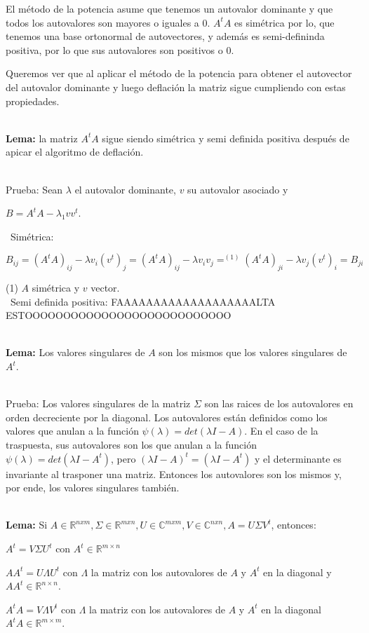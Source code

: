 El método de la potencia asume que tenemos un autovalor dominante y que todos los autovalores son
mayores o iguales a 0. $A^t A$ es simétrica por lo, que tenemos una base ortonormal de autovectores,
y además es semi-defininda positiva, por lo que sus autovalores son positivos o 0.

Queremos ver que al aplicar el método de la potencia para obtener el autovector del autovalor
dominante y luego deflación la matriz sigue cumpliendo con estas propiedades.

\ \\
\textbf{Lema:} la matriz $A^t A$ sigue siendo simétrica y semi definida positiva después de apicar el
algoritmo de deflación.

\ \\
Prueba: Sean $\lambda$ el autovalor dominante, $v$ su autovalor asociado y

$B = A^t A - \lambda_{1} v v^t$.

\ Simétrica:


\begin{center}
  $B_{ij} = (A^t A)_{ij} - \lambda v_i (v^t)_j = (A^t A)_{ij} - \lambda v_i v_j =^{(1)} (A^t A)_{ji}
  - \lambda v_j (v^t)_i = B_{ji}$
\end{center}

(1) $A$ simétrica y $v$ vector.
\ \\

\ Semi definida positiva: FAAAAAAAAAAAAAAAAAAALTA ESTOOOOOOOOOOOOOOOOOOOOOOOOOOO

\ \\
\textbf{Lema:} Los valores singulares de $A$ son los mismos que los valores singulares de $A^t$.

\ \\
Prueba: Los valores singulares de la matriz $\Sigma$ son las raices de los autovalores en orden
decreciente por la diagonal. Los autovalores están definidos como los valores que anulan a la
función
$\psi(\lambda) = det(\lambda I - A)$. En el caso de la traspuesta, sus autovalores son los que
anulan a la función $\psi(\lambda) = det(\lambda I - A^t)$, pero $(\lambda I - A)^t = (\lambda I -
A^t)$ y el determinante es invariante al trasponer una matriz. Entonces los autovalores son los
mismos y, por ende, los valores singulares también.


\ \\
\textbf{Lema:} Si $A \in \mathbb{R}^{nxm},\Sigma \in \mathbb{R}^{mxn}, U \in \mathbb{C}^{mxm}, V \in
\mathbb{C}^{nxn}, A = U \Sigma V^t$, entonces:
\begin{compactitem}
  \item $A^t = V \Sigma U^t $ con $A^t \in \mathbb{R}^{m \times n}$
  \item $A A^t = U \Lambda U^t $ con $\Lambda$ la matriz con los autovalores de $A$ y $A^t$ en
    la diagonal y $A A^t \in \mathbb{R}^{n \times n}$.
  \item $A^t A = V \Lambda V^t $ con $\Lambda$ la matriz con los autovalores de $A$ y $A^t$ en
    la diagonal $A^t A \in \mathbb{R}^{m \times m}$.
\end{compactitem}

